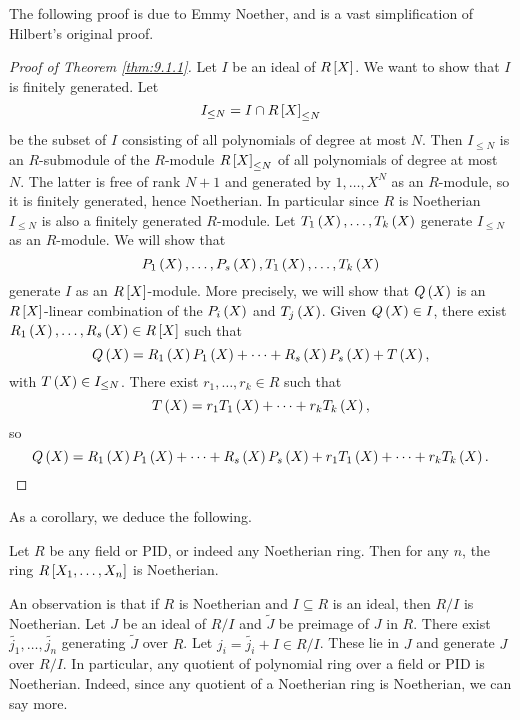 The following proof is due to Emmy Noether, and is a vast simplification of Hilbert's original proof.

\begin{proof}[Proof of Theorem \ref{thm:9.1.1}]
Let $ I $ be an ideal of $ R\sbr{X} $. We want to show that $ I $ is finitely generated. Let
$$ I_{\le N} = I \cap R\sbr{X}_{\le N} $$
be the subset of $ I $ consisting of all polynomials of degree at most $ N $. Then $ I_{\le N} $ is an $ R $-submodule of the $ R $-module $ R\sbr{X}_{\le N} $ of all polynomials of degree at most $ N $. The latter is free of rank $ N + 1 $ and generated by $ 1, \dots, X^N $ as an $ R $-module, so it is finitely generated, hence Noetherian. In particular since $ R $ is Noetherian $ I_{\le N} $ is also a finitely generated $ R $-module. Let $ T_1\br{X}, \dots, T_k\br{X} $ generate $ I_{\le N} $ as an $ R $-module. We will show that
$$ P_1\br{X}, \dots, P_s\br{X}, T_1\br{X}, \dots, T_k\br{X} $$
generate $ I $ as an $ R\sbr{X} $-module. More precisely, we will show that $ Q\br{X} $ is an $ R\sbr{X} $-linear combination of the $ P_i\br{X} $ and $ T_j\br{X} $. Given $ Q\br{X} \in I $, there exist $ R_1\br{X}, \dots, R_s\br{X} \in R\sbr{X} $ such that
$$ Q\br{X} = R_1\br{X}P_1\br{X} + \dots + R_s\br{X}P_s\br{X} + T\br{X}, $$
with $ T\br{X} \in I_{\le N} $. There exist $ r_1, \dots, r_k \in R $ such that
$$ T\br{X} = r_1T_1\br{X} + \dots + r_kT_k\br{X}, $$
so
$$ Q\br{X} = R_1\br{X}P_1\br{X} + \dots + R_s\br{X}P_s\br{X} + r_1T_1\br{X} + \dots + r_kT_k\br{X}. $$
\end{proof}

\pagebreak

As a corollary, we deduce the following.

\begin{corollary}
Let $ R $ be any field or PID, or indeed any Noetherian ring. Then for any $ n $, the ring $ R\sbr{X_1, \dots, X_n} $ is Noetherian.
\end{corollary}

An observation is that if $ R $ is Noetherian and $ I \subseteq R $ is an ideal, then $ R / I $ is Noetherian. Let $ J $ be an ideal of $ R / I $ and $ \widetilde{J} $ be preimage of $ J $ in $ R $. There exist $ \widetilde{j_1}, \dots, \widetilde{j_n} $ generating $ \widetilde{J} $ over $ R $. Let $ j_i = \widetilde{j_i} + I \in R / I $. These lie in $ J $ and generate $ J $ over $ R / I $. In particular, any quotient of polynomial ring over a field or PID is Noetherian. Indeed, since any quotient of a Noetherian ring is Noetherian, we can say more.

